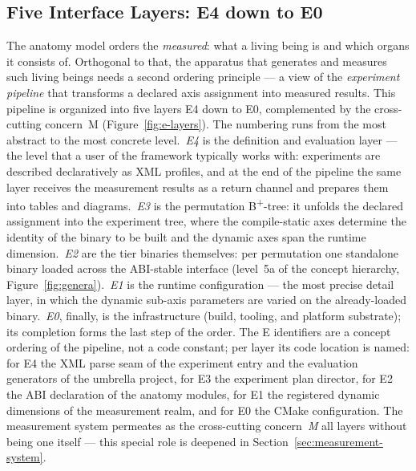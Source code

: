 \begin{nurlang}
\subsection{Five Interface Layers: E4 down to E0}\label{sec:anatomy-layers}
The anatomy model orders the \emph{measured}: what a living being is and which organs it
consists of. Orthogonal to that, the apparatus that generates and measures such living beings needs a second
ordering principle --- a view of the \emph{experiment pipeline} that transforms a declared axis assignment
into measured results. This pipeline is organized into five layers E4 down to E0, complemented by
the cross-cutting concern~M (Figure~\ref{fig:e-layers}). The numbering runs from the most abstract to the
most concrete level.\ \emph{E4} is the definition and evaluation layer --- the level that a
user of the framework typically works with: experiments are described declaratively as XML profiles,
and at the end of the pipeline the same layer receives the measurement results as a return channel
and prepares them into tables and diagrams.\ \emph{E3} is the
permutation B\textsuperscript{+}-tree: it unfolds the declared assignment into the experiment tree, where
the compile-static axes determine the identity of the binary to be built and the dynamic
axes span the runtime dimension.\ \emph{E2} are the tier binaries themselves: per permutation one
standalone binary loaded across the ABI-stable interface (level~5a of the concept hierarchy,
Figure~\ref{fig:genera}).\ \emph{E1} is the runtime configuration --- the most precise
detail layer, in which the dynamic sub-axis parameters are varied on the already-loaded binary.\ \emph{E0}, finally, is the infrastructure (build, tooling, and platform substrate); its
completion forms the last step of the order. The E identifiers are a concept ordering of the pipeline, not a
code constant; per layer its code location is named: for E4 the XML parse seam of the experiment entry
and the evaluation generators of the umbrella project, for E3 the experiment plan director, for
E2 the ABI declaration of the anatomy modules, for E1 the registered dynamic dimensions of the
measurement realm, and for E0 the CMake configuration. The measurement system permeates as the cross-cutting concern~\emph{M}
all layers without being one itself --- this special role is deepened in Section~\ref{sec:measurement-system}.
\end{nurlang}
